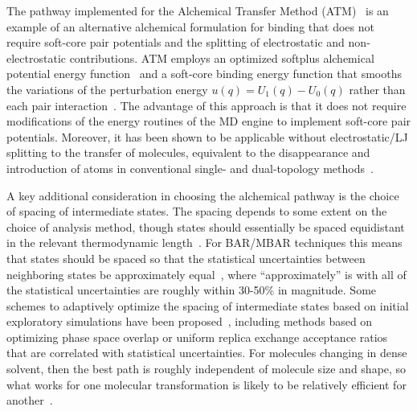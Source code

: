 \documentclass[9pt,bestpractices]{livecoms}
\begin{document}
The pathway implemented for the Alchemical Transfer Method (ATM)~\cite{pal2019perturbation,khuttan2021alchemical,wu2021alchemical,azimi2022relative} is an example of an alternative alchemical formulation for binding that does not require soft-core pair potentials and the splitting of electrostatic and non-electrostatic contributions. ATM employs an optimized softplus alchemical potential energy function~\cite{pal2019perturbation} and a soft-core binding energy function that smooths the variations of the perturbation energy $u(q) = U_1(q) - U_0(q)$ rather than each pair interaction~\cite{khuttan2021alchemical}. The advantage of this approach is that it does not require modifications of the energy routines of the MD engine to implement soft-core pair potentials. Moreover, it has been shown to be applicable without electrostatic/LJ splitting to the transfer of molecules, equivalent to the disappearance and introduction of atoms in conventional single- and dual-topology methods~\cite{khuttan2021alchemical}.

A key additional consideration in choosing the alchemical pathway is the choice of spacing of intermediate states.
The spacing depends to some extent on the choice of analysis method, though states should essentially be spaced equidistant in the relevant thermodynamic length~\cite{crooks2007measuring, sivak2012thermodynamic}.
For BAR/MBAR techniques this means that states should be spaced so that the statistical uncertainties between neighboring states be approximately equal~\cite{pham2012optimal, shenfeld2009minimizing}, where ``approximately'' is with all of the statistical uncertainties are roughly within 30-50\% in magnitude. 
Some schemes to adaptively optimize the spacing of intermediate states based on initial exploratory simulations have been proposed~\cite{hayes2017adaptive,zhang_jchemtheorycomput_2024_v20_p3935}, including methods based on optimizing phase space overlap or uniform replica exchange acceptance ratios~\cite{zhang_jchemtheorycomput_2024_v20_p3935} that are correlated with statistical uncertainties. For molecules changing in dense solvent, then the best path is roughly independent of molecule size and shape, so what works for one molecular transformation is likely to be relatively efficient for another~\cite{monroe2014converging}.
\end{document}
